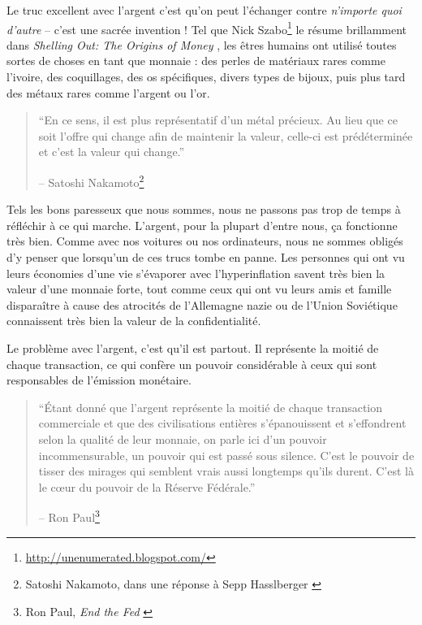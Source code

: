Le truc excellent avec l'argent c'est qu'on peut l'échanger contre
\textit{n'importe quoi d'autre} -- c'est une sacrée invention ! Tel que Nick
Szabo\footnote{\url{http://unenumerated.blogspot.com/}} le résume
brillamment dans \textit{Shelling Out: The Origins of Money}
\cite{shelling-out}, les êtres humains ont utilisé toutes sortes de choses en
tant que monnaie : des perles de matériaux rares comme l'ivoire, des
coquillages, des os spécifiques, divers types de bijoux, puis plus tard des
métaux rares comme l'argent ou l'or.

\begin{quotation}\begin{samepage}
\enquote{En ce sens, il est plus représentatif d'un métal précieux. Au lieu que
ce soit l'offre qui change afin de maintenir la valeur, celle-ci est
prédéterminée et c'est la valeur qui change.}
\begin{flushright} -- Satoshi Nakamoto\footnote{Satoshi Nakamoto, dans une
réponse à Sepp Hasslberger \cite{satoshi-precious-metal}}
\end{flushright}\end{samepage}\end{quotation}

Tels les bons paresseux que nous sommes, nous ne passons pas trop de temps à
réfléchir à ce qui marche. L'argent, pour la plupart d'entre nous, ça fonctionne
très bien. Comme avec nos voitures ou nos ordinateurs, nous ne sommes obligés
d'y penser que lorsqu'un de ces trucs tombe en panne. Les personnes qui ont vu
leurs économies d'une vie s'évaporer avec l'hyperinflation savent très bien la
valeur d'une monnaie forte, tout comme ceux qui ont vu leurs amis et famille
disparaître à cause des atrocités de l'Allemagne nazie ou de l'Union Soviétique
connaissent très bien la valeur de la confidentialité.

Le problème avec l'argent, c'est qu'il est partout. Il représente la moitié de
chaque transaction, ce qui confère un pouvoir considérable à ceux qui sont
responsables de l'émission monétaire.

\begin{quotation}\begin{samepage}
\enquote{Étant donné que l'argent représente la moitié de chaque transaction
commerciale et que des civilisations entières s'épanouissent et s'effondrent
selon la qualité de leur monnaie, on parle ici d'un pouvoir incommensurable, un
pouvoir qui est passé sous silence. C'est le pouvoir de tisser des mirages qui
semblent vrais aussi longtemps qu'ils durent. C'est là le cœur du pouvoir de la
Réserve Fédérale.}
\begin{flushright} -- Ron Paul\footnote{Ron Paul, \textit{End the Fed}
\cite{end-the-fed}}
\end{flushright}\end{samepage}\end{quotation}

